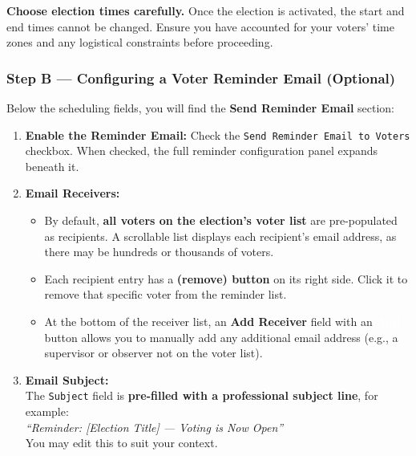 \documentclass[12pt,a4paper,openany]{book}
\newcommand{\uibutton}[1]{\colorbox{primaryblue}{\textcolor{white}{\small\textbf{#1}}}}
\newcommand{\uifield}[1]{\texttt{\color{accentteal}#1}}
\begin{document}
\begin{tcolorbox}[warnbox]
	\textbf{Choose election times carefully.} Once the election is activated, the start and end times cannot be changed. Ensure you have accounted for your voters' time zones and any logistical constraints before proceeding.
\end{tcolorbox}

\subsubsection{Step B --- Configuring a Voter Reminder Email (Optional)}

Below the scheduling fields, you will find the \textbf{Send Reminder Email} section:

\begin{enumerate}
	\item \textbf{Enable the Reminder Email:} Check the \uifield{Send Reminder Email to Voters} checkbox. When checked, the full reminder configuration panel expands beneath it.

	\item \textbf{Email Receivers:}
	      \begin{itemize}
		      \item By default, \textbf{all voters on the election's voter list} are pre-populated as recipients. A scrollable list displays each recipient's email address, as there may be hundreds or thousands of voters.
		      \item Each recipient entry has a \textbf{\texttimes{} (remove) button} on its right side. Click it to remove that specific voter from the reminder list.
		      \item At the bottom of the receiver list, an \textbf{Add Receiver} field with an \uibutton{Add} button allows you to manually add any additional email address (e.g., a supervisor or observer not on the voter list).
	      \end{itemize}

	\item \textbf{Email Subject:}\\
	      The \uifield{Subject} field is \textbf{pre-filled with a professional subject line}, for example:\\
	      \emph{``Reminder: [Election Title] --- Voting is Now Open''}\\
	      You may edit this to suit your context.


\end{enumerate}
\end{document}
